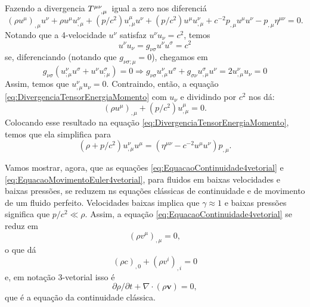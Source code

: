 Fazendo a divergencia $\tensor{T}{^{\mu\nu}_{,\mu}}$ igual a zero nos diferenciá
\begin{equation}\label{eq:DivergenciaTensorEnergiaMomento}
	\left(\rho u^{\mu}\right)_{, \mu} u^{\nu}+\rho u^{\mu} u_{, \mu}^{\nu}+\left(p / c^{2}\right) u_{, \mu}^{\mu} u^{\nu}+\left(p / c^{2}\right) u^{\mu} u_{, \mu}^{\nu}+c^{-2} p_{, \mu} u^{\mu} u^{\nu}-p_{, \mu} \eta^{\mu \nu}=0.
\end{equation}
Notando que a 4-velocidade $u^\nu$ satisfaz $u^{\nu}u_\nu=c^2$, temos
\[
	u^\nu u_\nu = g_{\nu\sigma}u^\nu u^\sigma = c^2
\]
se, diferenciando (notando que $g_{\nu\sigma;\mu}=0$), chegamos em
\[
	g_{\nu\sigma}\left(u^{\nu}_{;\mu}u^{\sigma}+u^{\nu}u^{\sigma}_{;\mu}\right)=0 
	\Rightarrow g_{\nu\sigma}u^{\nu}_{,\mu}u^{\sigma}+g_{\sigma\nu}u^{\sigma}_{,\mu}u^{\nu}= 2u_{,\mu}^{\nu} u_{\nu} = 0
\]
Assim, temos que $u_{,\mu}^{\nu} u_{\nu} = 0$. Contraindo, então, a equação \eqref{eq:DivergenciaTensorEnergiaMomento} com $u_\nu$ e dividindo por $c^2$ nos dá:
\begin{equation}\label{eq:EquacaoContinuidade4vetorial}
	\boxed{
		\left(\rho u^{\mu}\right)_{, \mu}+\left(p / c^{2}\right) u_{, \mu}^{\mu}=0.
	}
\end{equation}
Colocando esse resultado na equação \eqref{eq:DivergenciaTensorEnergiaMomento}, temos que ela simplifica para
\begin{equation}\label{eq:EquacaoMovimentoEuler4vetorial}
	\boxed{
		\left(\rho+p / c^{2}\right) u_{, \mu}^{\nu} u^{\mu}=\left(\eta^{\mu \nu}-c^{-2} u^{\mu} u^{\nu}\right) p_{, \mu}	.
	}
\end{equation}

Vamos mostrar, agora, que as equações \eqref{eq:EquacaoContinuidade4vetorial} e \eqref{eq:EquacaoMovimentoEuler4vetorial}, para fluidos em baixas velocidades e baixas pressões, se reduzem ns equações clássicas de continuidade e de movimento de um fluido perfeito. Velocidades baixas implica que $\gamma\approx1$ e baixas pressões significa que $p/c^2 \ll \rho$. Assim, a equação  \eqref{eq:EquacaoContinuidade4vetorial} se reduz em
\[\left(\rho v^{\mu}\right)_{, \mu}=0,\]
o que dá
\[(\rho c)_{, 0}+\left(\rho v^{i}\right)_{, i}=0\]
e, em notação 3-vetorial isso é
\begin{equation}\label{eq:EquacaoContinuidadeClassica3vetorial}
	\boxed{
		\partial \rho / \partial t+\nabla \cdot(\rho \mathbf{v})=0,
	}
\end{equation}
que é a equação da continuidade clássica.


